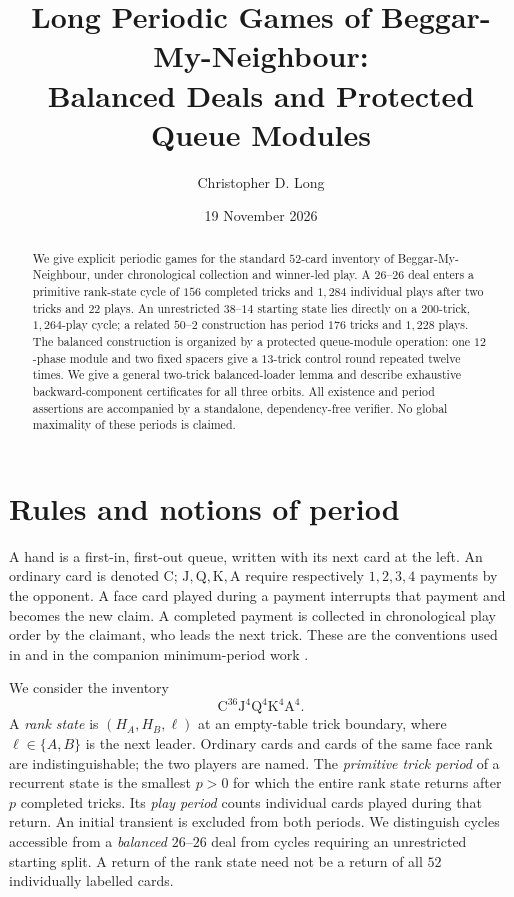 \documentclass[11pt]{article}
\title{Long Periodic Games of Beggar-My-Neighbour:\\Balanced Deals and Protected Queue Modules}
\author{Christopher D. Long}
\date{19 November 2026}
\newcommand{\C}{\mathrm C}
\newcommand{\J}{\mathrm J}
\newcommand{\Q}{\mathrm Q}
\newcommand{\K}{\mathrm K}
\renewcommand{\AA}{\mathrm A}
\begin{document}
\maketitle
\begin{abstract}
We give explicit periodic games for the standard $52$-card inventory of
Beggar-My-Neighbour, under chronological collection and winner-led play.
A $26$--$26$ deal enters a primitive rank-state cycle of $156$ completed
tricks and $1{,}284$ individual plays after two tricks and $22$ plays.
An unrestricted $38$--$14$ starting state lies directly on a $200$-trick,
$1{,}264$-play cycle; a related $50$--$2$ construction has period $176$
tricks and $1{,}228$ plays. The balanced construction is organized by a
protected queue-module operation: one $12$-phase module and two fixed
spacers give a $13$-trick control round repeated twelve times.
We give a general two-trick balanced-loader lemma and describe exhaustive
backward-component certificates for all three orbits. All existence and
period assertions are accompanied by a standalone, dependency-free verifier.
No global maximality of these periods is claimed.
\end{abstract}

\section{Rules and notions of period}
A hand is a first-in, first-out queue, written with its next card at the
left. An ordinary card is denoted $\C$; $\J,\Q,\K,\AA$ require respectively
$1,2,3,4$ payments by the opponent. A face card played during a payment
interrupts that payment and becomes the new claim. A completed payment is
collected in chronological play order by the claimant, who leads the next
trick. These are the conventions used in \cite{casella} and in the
companion minimum-period work \cite{longshort}.

We consider the inventory
\[
  \C^{36}\J^4\Q^4\K^4\AA^4.
\]
A \emph{rank state} is $(H_A,H_B,\ell)$ at an empty-table trick boundary,
where $\ell\in\{A,B\}$ is the next leader. Ordinary cards and cards of
the same face rank are indistinguishable; the two players are named.
The \emph{primitive trick period} of a recurrent state is the smallest
$p>0$ for which the entire rank state returns after $p$ completed tricks.
Its \emph{play period} counts individual cards played during that return.
An initial transient is excluded from both periods. We distinguish cycles
accessible from a \emph{balanced} $26$--$26$ deal from cycles requiring an
unrestricted starting split. A return of the rank state need not be a
return of all $52$ individually labelled cards.
\end{document}
